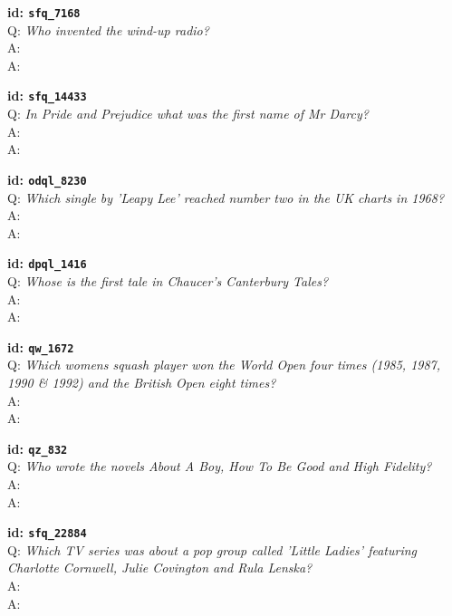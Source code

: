 \tiny{\setlength{\parindent}{0cm}
\textbf{id: \texttt{sfq\_7168}} \\
Q: \textit{Who invented the wind-up radio?} \\
A:  \\
A: }

\tiny{\setlength{\parindent}{0cm}
\textbf{id: \texttt{sfq\_14433}} \\
Q: \textit{In Pride and Prejudice what was the first name of Mr Darcy?} \\
A:  \\
A: }

\tiny{\setlength{\parindent}{0cm}
\textbf{id: \texttt{odql\_8230}} \\
Q: \textit{Which single by 'Leapy Lee' reached number two in the UK charts in 1968?} \\
A:  \\
A: }

\tiny{\setlength{\parindent}{0cm}
\textbf{id: \texttt{dpql\_1416}} \\
Q: \textit{Whose is the first tale in Chaucer’s Canterbury Tales?} \\
A:  \\
A: }

\tiny{\setlength{\parindent}{0cm}
\textbf{id: \texttt{qw\_1672}} \\
Q: \textit{Which womens squash player won the World Open four times (1985, 1987, 1990 \& 1992) and the British Open eight times?} \\
A:  \\
A: }

\tiny{\setlength{\parindent}{0cm}
\textbf{id: \texttt{qz\_832}} \\
Q: \textit{Who wrote the novels About A Boy, How To Be Good and High Fidelity?} \\
A:  \\
A: }

\tiny{\setlength{\parindent}{0cm}
\textbf{id: \texttt{sfq\_22884}} \\
Q: \textit{Which TV series was about a pop group called 'Little Ladies' featuring Charlotte Cornwell, Julie Covington and Rula Lenska?} \\
A:  \\
A: }

